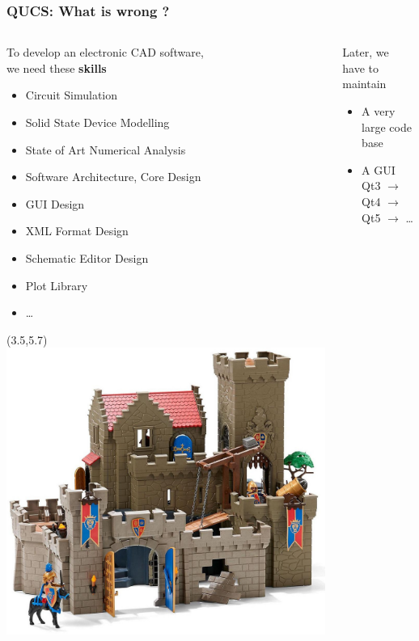 \begin{frame}
  \frametitle{QUCS: What is wrong ?}
  \begin{columns}
    \begin{column}[t]{.5\textwidth}
      To develop an electronic CAD software, \\
      we need these \textbf{skills} %
      {\footnotesize
        \begin{itemize}
        \item Circuit Simulation
        \item Solid State Device Modelling
        \item State of Art Numerical Analysis
        \item Software Architecture, Core Design
        \item GUI Design
        \item XML Format Design
        \item Schematic Editor Design
        \item Plot Library
        \item \ldots
        \end{itemize}%
      }
      \begin{textblock}{6}(3.5,5.7) %
        \includegraphics[width=.55\textwidth]{images/playmobil-t.png}
      \end{textblock}
    \end{column}
    \begin{column}[t]{.5\textwidth}
      Later, we have to \alert{maintain} \\[.5em]
      \begin{itemize}
        \item A very large code base
        \item A GUI Qt3 $\rightarrow$ Qt4 $\rightarrow$ Qt5 $\rightarrow$ \ldots \\[1em]
      \end{itemize}

\end{column}
\end{columns}
\end{frame}
